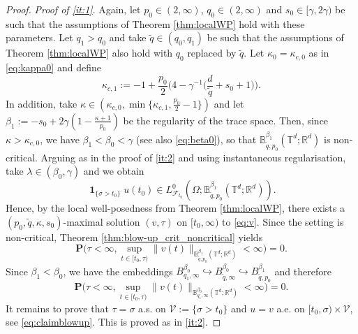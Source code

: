 \documentclass[11pt, a4paper,oneside, reqno]{amsart}
\theoremstyle{remark} %
\theoremstyle{definition} %
\numberwithin{theorem}{section}
\numberwithin{equation}{section}
\newcommand{\T}{\mathbb{T}}
\newcommand{\RR}{\mathbb{R}}
\newcommand{\BB}{\mathbb{B}}
\newcommand{\gam}{\gamma}
\renewcommand{\tilde}[1]{\widetilde{#1}}
\DeclareMathOperator{\ind}{\mathbf{1}}
\begin{document}
\begin{proof}
\textit{Proof of \ref{it:1}}. Again, let $p_0\in (2,\infty)$, $q_0\in (2,\infty)$ and $s_0\in [\gam, 2\gam)$ be such that the assumptions of Theorem \ref{thm:localWP} hold with these parameters. Let $q_1>q_0$ and take  $\tilde{q}\in (q_0, q_1)$ be such that the assumptions of Theorem \ref{thm:localWP} also hold with $q_0$ replaced by $\tilde{q}$. Let $\kappa_0= \kappa_{c,0}$ as in \eqref{eq:kappa0} and define 
\begin{equation*}
    \kappa_{c,1}:= -1  + \frac{p_0}{2}\big(4-\gam^{-1}\big(\frac{d}{\tilde{q}}+s_0+1\big)\big).
\end{equation*}
In addition, take $\kappa\in (\kappa_{c,0}, \min\{\kappa_{c,1}, \frac{p_0}{2}-1\})$ and let $\beta_1:=-s_0+2\gam(1-\frac{\kappa+1}{p_0})$ be the regularity of the trace space. Then, since $\kappa> \kappa_{c,0}$, we have $\beta_1<\beta_0<\gam$ (see also \eqref{eq:beta0}), so that $\BB^{\beta_1}_{\tilde{q}, p_0}(\T^d;\RR^d)$ is non-critical. Arguing as in the proof of \ref{it:2} and using instantaneous regularisation, take $\lambda\in (\beta_0,\gam)$ and we obtain 
\begin{equation*}
    \ind_{\{\sigma>t_0\}}u(t_0)\in L^0_{\mathcal{F}_{t_0}}(\Omega; \BB^{\beta_1}_{\tilde{q}, p_0}(\T^d; \RR^d)).
\end{equation*}
Hence, by the local well-posedness from Theorem \ref{thm:localWP}, there exists a $(p_0,\tilde{q},\kappa,s_0)$-maximal solution $(v, \tau)$ on $[t_0,\infty)$ to \eqref{eq:v}. Since the setting is non-critical, Theorem \ref{thm:blow-up_crit_noncritical} yields 
\begin{equation*}
    \mathbf{P}\big(\tau < \infty,\sup\limits_{t \in [t_0, \tau)} \|v(t)\|_{{\BB^{\beta_1}_{\tilde{q},p_0}(\T^d;\RR^d)}}<\infty\big) = 0.
\end{equation*}
Since $\beta_1<\beta_0$, we have the embeddings $B^{\beta_0}_{q_1,\infty}\hookrightarrow B^{\beta_0}_{\tilde{q},\infty}\hookrightarrow B^{\beta_1}_{\tilde{q}, p_0}$ and therefore
\begin{equation*}
    \mathbf{P}\big(\tau < \infty,\sup\limits_{t \in [t_0, \tau)} \|v(t)\|_{{\BB^{\beta_0}_{q_1,\infty}(\T^d;\RR^d)}}<\infty\big) = 0.
\end{equation*}
It remains to prove that $\tau=\sigma$ a.s. on $\mathcal{V}:=\{\sigma>t_0\}$ and $u=v$ a.e. on $[t_0, \sigma)\times \mathcal{V}$, see \eqref{eq:claimblowup}. This is proved as in \ref{it:2}.
\end{proof}
\end{document}
